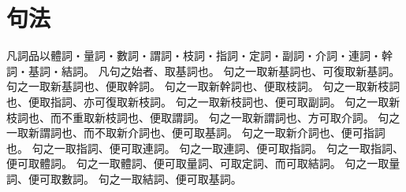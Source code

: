 \chapter{句法}
凡詞品以體詞・量詞・數詞・謂詞・枝詞・指詞・定詞・副詞・介詞・連詞・幹詞・基詞・結詞。
凡句之始者、取基詞也。
句之一取新基詞也、可復取新基詞。
句之一取新基詞也、便取幹詞。
句之一取新幹詞也、便取枝詞。
句之一取新枝詞也、便取指詞、亦可復取新枝詞。
句之一取新枝詞也、便可取副詞。
句之一取新枝詞也、而不重取新枝詞也、便取謂詞。
句之一取新謂詞也、方可取介詞。
句之一取新謂詞也、而不取新介詞也、便可取基詞。
句之一取新介詞也、便可指詞也。
句之一取指詞、便可取連詞。
句之一取連詞、便可取指詞。
句之一取指詞、便可取體詞。
句之一取體詞、便可取量詞、可取定詞、而可取結詞。
句之一取量詞、便可取數詞。
句之一取結詞、便可取基詞。
